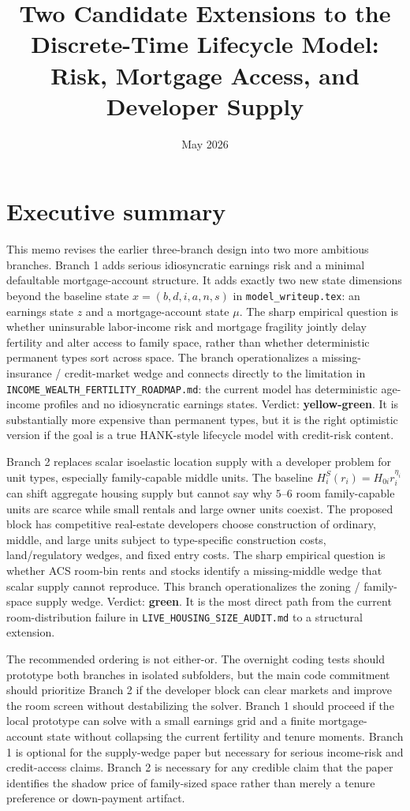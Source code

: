 \documentclass[11pt]{article}
\title{Two Candidate Extensions to the Discrete-Time Lifecycle Model:\\
Risk, Mortgage Access, and Developer Supply}
\author{}
\date{May 2026}
\begin{document}
\maketitle

\section{Executive summary}

This memo revises the earlier three-branch design into two more ambitious branches. Branch 1 adds serious idiosyncratic earnings risk and a minimal defaultable mortgage-account structure. It adds exactly two new state dimensions beyond the baseline state $x=(b,d,i,a,n,s)$ in \texttt{model\_writeup.tex}: an earnings state $z$ and a mortgage-account state $\mu$. The sharp empirical question is whether uninsurable labor-income risk and mortgage fragility jointly delay fertility and alter access to family space, rather than whether deterministic permanent types sort across space. The branch operationalizes a missing-insurance / credit-market wedge and connects directly to the limitation in \texttt{INCOME\_WEALTH\_FERTILITY\_ROADMAP.md}: the current model has deterministic age-income profiles and no idiosyncratic earnings states. Verdict: \textbf{yellow-green}. It is substantially more expensive than permanent types, but it is the right optimistic version if the goal is a true HANK-style lifecycle model with credit-risk content.

Branch 2 replaces scalar isoelastic location supply with a developer problem for unit types, especially family-capable middle units. The baseline $H_i^S(r_i)=H_{0i}r_i^{\eta_i}$ can shift aggregate housing supply but cannot say why $5$--$6$ room family-capable units are scarce while small rentals and large owner units coexist. The proposed block has competitive real-estate developers choose construction of ordinary, middle, and large units subject to type-specific construction costs, land/regulatory wedges, and fixed entry costs. The sharp empirical question is whether ACS room-bin rents and stocks identify a missing-middle wedge that scalar supply cannot reproduce. This branch operationalizes the zoning / family-space supply wedge. Verdict: \textbf{green}. It is the most direct path from the current room-distribution failure in \texttt{LIVE\_HOUSING\_SIZE\_AUDIT.md} to a structural extension.

The recommended ordering is not either-or. The overnight coding tests should prototype both branches in isolated subfolders, but the main code commitment should prioritize Branch 2 if the developer block can clear markets and improve the room screen without destabilizing the solver. Branch 1 should proceed if the local prototype can solve with a small earnings grid and a finite mortgage-account state without collapsing the current fertility and tenure moments. Branch 1 is optional for the supply-wedge paper but necessary for serious income-risk and credit-access claims. Branch 2 is necessary for any credible claim that the paper identifies the shadow price of family-sized space rather than merely a tenure preference or down-payment artifact.
\end{document}
